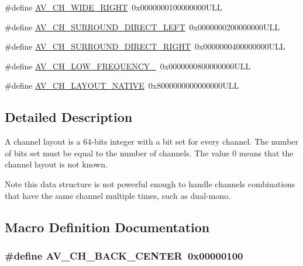 \begin{DoxyCompactItemize}
\item 
\#define \hyperlink{group__channel__masks_ga2c7ff738c3481d2891d052f5bca55248}{A\+V\+\_\+\+C\+H\+\_\+\+W\+I\+D\+E\+\_\+\+R\+I\+G\+HT}~0x0000000100000000\+U\+LL
\item 
\#define \hyperlink{group__channel__masks_gafc04912a8294d8788e4162092df8a549}{A\+V\+\_\+\+C\+H\+\_\+\+S\+U\+R\+R\+O\+U\+N\+D\+\_\+\+D\+I\+R\+E\+C\+T\+\_\+\+L\+E\+FT}~0x0000000200000000\+U\+LL
\item 
\#define \hyperlink{group__channel__masks_ga0c9137cc9fd60d15be588e2eff3cfa23}{A\+V\+\_\+\+C\+H\+\_\+\+S\+U\+R\+R\+O\+U\+N\+D\+\_\+\+D\+I\+R\+E\+C\+T\+\_\+\+R\+I\+G\+HT}~0x0000000400000000\+U\+LL
\item 
\#define \hyperlink{group__channel__masks_ga72d2eaef6727608379ab29859f5d5ee2}{A\+V\+\_\+\+C\+H\+\_\+\+L\+O\+W\+\_\+\+F\+R\+E\+Q\+U\+E\+N\+C\+Y\+\_}~0x0000000800000000\+U\+LL
\item 
\#define \hyperlink{group__channel__masks_ga7ab04ac641edef25c03de0a577eab57d}{A\+V\+\_\+\+C\+H\+\_\+\+L\+A\+Y\+O\+U\+T\+\_\+\+N\+A\+T\+I\+VE}~0x8000000000000000\+U\+LL
\end{DoxyCompactItemize}


\subsection{Detailed Description}
A channel layout is a 64-\/bits integer with a bit set for every channel. The number of bits set must be equal to the number of channels. The value 0 means that the channel layout is not known. \begin{DoxyNote}{Note}
this data structure is not powerful enough to handle channels combinations that have the same channel multiple times, such as dual-\/mono. 
\end{DoxyNote}


\subsection{Macro Definition Documentation}
\subsubsection[{\texorpdfstring{A\+V\+\_\+\+C\+H\+\_\+\+B\+A\+C\+K\+\_\+\+C\+E\+N\+T\+ER}{AV_CH_BACK_CENTER}}]{\setlength{\rightskip}{0pt plus 5cm}\#define A\+V\+\_\+\+C\+H\+\_\+\+B\+A\+C\+K\+\_\+\+C\+E\+N\+T\+ER~0x00000100}\hypertarget{group__channel__masks_ga68650a364e52edb62d5984dddec4f935}{}\label{group__channel__masks_ga68650a364e52edb62d5984dddec4f935}


